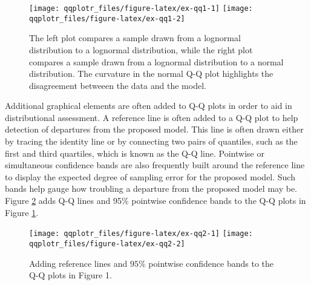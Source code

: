 \begin{Schunk}
\begin{figure}

{\centering \texttt{[image: qqplotr\_files/figure-latex/ex-qq1-1]} \texttt{[image: qqplotr\_files/figure-latex/ex-qq1-2]} 

}

\caption[The left plot compares a sample drawn from a lognormal distribution to a lognormal distribution, while the right plot compares a sample drawn from a lognormal distribution to a normal distribution]{The left plot compares a sample drawn from a lognormal distribution to a lognormal distribution, while the right plot compares a sample drawn from a lognormal distribution to a normal distribution. The curvature in the normal Q-Q plot highlights the disagreement betweeen the data and the model.}\label{fig:ex-qq1}
\end{figure}
\end{Schunk}

Additional graphical elements are often added to Q-Q plots in order to
aid in distributional assessment. A reference line is often added to a
Q-Q plot to help detection of departures from the proposed model. This
line is often drawn either by tracing the identity line or by connecting
two pairs of quantiles, such as the first and third quartiles, which is
known as the Q-Q line. Pointwise or simultaneous confidence bands are
also frequently built around the reference line to display the expected
degree of sampling error for the proposed model. Such bands help gauge
how troubling a departure from the proposed model may be. Figure
\ref{fig:ex-qq2} adds Q-Q lines and 95\% pointwise confidence bands to
the Q-Q plots in Figure \ref{fig:ex-qq1}.

\begin{Schunk}
\begin{figure}

{\centering \texttt{[image: qqplotr\_files/figure-latex/ex-qq2-1]} \texttt{[image: qqplotr\_files/figure-latex/ex-qq2-2]} 

}

\caption[Adding reference lines and $95\%$ pointwise confidence bands to the Q-Q plots in Figure 1]{Adding reference lines and $95\%$ pointwise confidence bands to the Q-Q plots in Figure 1.}\label{fig:ex-qq2}
\end{figure}
\end{Schunk}

